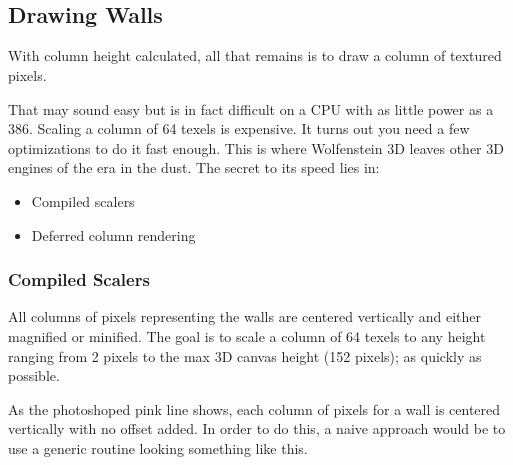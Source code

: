  \begin{minipage}{\textwidth}
 
\centering
\vspace*{0.5cm}\\
\centering


 \end{minipage}


 \par
 
 \begin{minipage}{\textwidth}
\centering
\vspace*{0.5cm}\\
\centering
\end{minipage}











\subsection{Drawing Walls}
With column height calculated, all that remains is to draw a column of textured pixels.\\
\par
That may sound easy but is in fact difficult on a CPU with as little power as a 386. Scaling a column of 64 texels is expensive. It turns out you need a few optimizations to do it fast enough. This is where Wolfenstein 3D leaves other 3D engines of the era in the dust. The secret to its speed lies in:
\begin{itemize}
\item Compiled scalers
\item Deferred column rendering
\end{itemize}
\par








\subsubsection{Compiled Scalers}
All columns of pixels representing the walls are centered vertically and either magnified or minified. The goal is to scale a column of 64 texels to any height ranging from 2 pixels to the max 3D canvas height (152 pixels); as quickly as possible.\\
\par
 \begin{figure}[H]
\centering
 \end{figure}
\par
As the photoshoped pink line shows, each column of pixels for a wall is centered vertically with no offset added. In order to do this, a naive approach would be to use a generic routine looking something like this.\\


